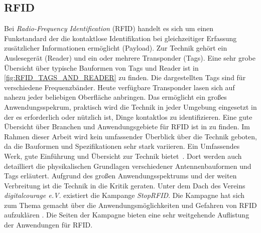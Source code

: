 \subsection{RFID}
%
Bei \textit{Radio-Frequency Identification} (RFID) handelt es sich um einen Funkstandard der die kontaktlose Identifikation bei gleichzeitiger Erfassung zusätzlicher Informationen ermöglicht (Payload). Zur Technik gehört ein Auslesegerät (Reader) und ein oder mehrere Transponder (Tags). Eine sehr grobe Übersicht über typische Bauformen von Tags und Reader ist in \ref{fig:RFID_TAGS_AND_READER} zu finden. Die dargestellten Tags sind für verschiedene Frequenzbänder. Heute verfügbare Transponder lasen sich auf nahezu jeder beliebigen Oberfläche anbringen. Das ermöglicht ein großes Anwendungsspekrum, praktisch wird die Technik in jeder Umgebung eingesetzt in der es erforderlich oder nützlich ist, Dinge kontaktlos zu identifizieren. Eine gute Übersicht über Branchen und Anwendungsgebiete für RFID ist in \cite{RFIDJournal} zu finden. Im Rahmen dieser Arbeit wird kein umfassender Überblick über die Technik geboten, da die Bauformen und Spezifikationen sehr stark variieren. Ein Umfassendes Werk, gute Einführung und Übersicht zur Technik bietet~\cite{finkenzeller2008rfid}. Dort werden auch detailliert die physikalischen Grundlagen verschiedener Antennenbauformen und Tags erläutert. Aufgrund des großen Anwendungsspektrums und der weiten Verbreitung ist die Technik in die Kritik geraten. Unter dem Dach des Vereins \textit{digitalcourage e.V.} existiert die Kampange \textit{StopRFID}. Die Kampagne hat sich zum Thema gemacht über die Anwendungsmöglichkeiten und Gefahren von RFID aufzuklären \cite{stoprfid2013}. Die Seiten der Kampagne bieten eine sehr weitgehende Auflistung der Anwendungen für RFID.\\
%
